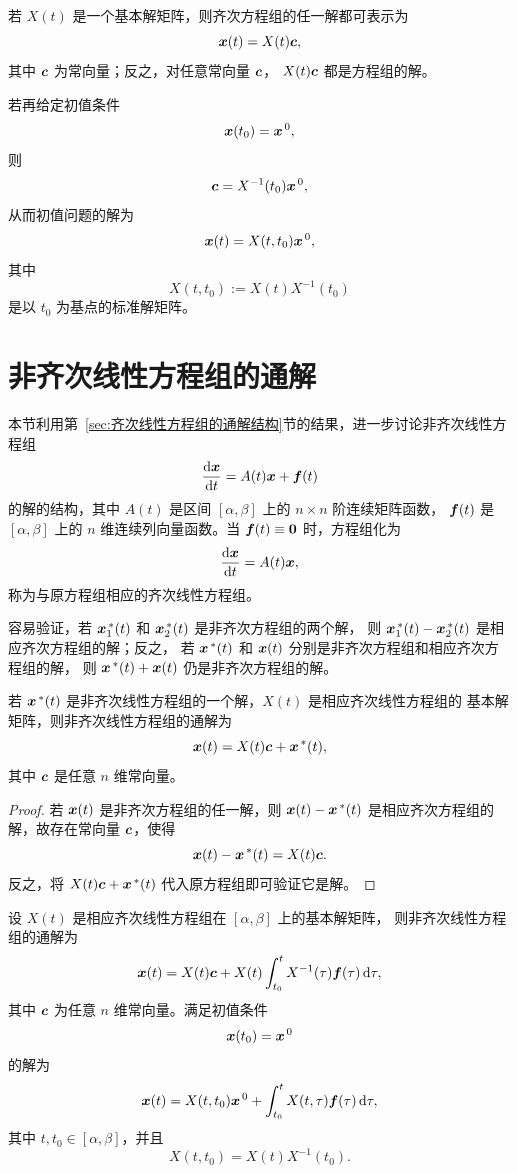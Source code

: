 若 $X(t)$ 是一个基本解矩阵，则齐次方程组的任一解都可表示为
\[
	\boldsymbol{x}(t)=X(t)\boldsymbol{c},
\]
其中 $\boldsymbol{c}$ 为常向量；反之，对任意常向量 $\boldsymbol{c}$，
$X(t)\boldsymbol{c}$ 都是方程组的解。

若再给定初值条件
\[
	\boldsymbol{x}(t_0)=\boldsymbol{x}^{\,0},
\]
则
\[
	\boldsymbol{c}=X^{-1}(t_0)\boldsymbol{x}^{\,0},
\]
从而初值问题的解为
\[
	\boldsymbol{x}(t)=X(t,t_0)\boldsymbol{x}^{\,0},
\]
其中
\[
	X(t,t_0):=X(t)X^{-1}(t_0)
\]
是以 $t_0$ 为基点的标准解矩阵。

\section{非齐次线性方程组的通解}\label{sec:非齐次线性方程组的通解}

本节利用第~\ref{sec:齐次线性方程组的通解结构}节的结果，进一步讨论非齐次线性方程组
\[
	\dfrac{\mathrm{d}\boldsymbol{x}}{\mathrm{d} t}=A(t)\boldsymbol{x}+\boldsymbol{f}(t)
\]
的解的结构，其中 $A(t)$ 是区间 $[\alpha,\beta]$ 上的 $n\times n$ 阶连续矩阵函数，
$\boldsymbol{f}(t)$ 是 $[\alpha,\beta]$ 上的 $n$ 维连续列向量函数。当
$\boldsymbol{f}(t)\equiv\boldsymbol{0}$ 时，方程组化为
\[
	\dfrac{\mathrm{d}\boldsymbol{x}}{\mathrm{d} t}=A(t)\boldsymbol{x},
\]
称为与原方程组相应的齐次线性方程组。

容易验证，若 $\boldsymbol{x}_1^{\,*}(t)$ 和 $\boldsymbol{x}_2^{\,*}(t)$ 是非齐次方程组的两个解，
则 $\boldsymbol{x}_1^{\,*}(t)-\boldsymbol{x}_2^{\,*}(t)$ 是相应齐次方程组的解；反之，
若 $\boldsymbol{x}^{\,*}(t)$ 和 $\boldsymbol{x}(t)$ 分别是非齐次方程组和相应齐次方程组的解，
则 $\boldsymbol{x}^{\,*}(t)+\boldsymbol{x}(t)$ 仍是非齐次方程组的解。

\begin{theorem}\label{thm:非齐次线性方程组的通解结构}
	若 $\boldsymbol{x}^{\,*}(t)$ 是非齐次线性方程组的一个解，$X(t)$ 是相应齐次线性方程组的
	基本解矩阵，则非齐次线性方程组的通解为
	\[
		\boldsymbol{x}(t)=X(t)\boldsymbol{c}+\boldsymbol{x}^{\,*}(t),
	\]
	其中 $\boldsymbol{c}$ 是任意 $n$ 维常向量。
\end{theorem}

\begin{proof}
	若 $\boldsymbol{x}(t)$ 是非齐次方程组的任一解，则
	$\boldsymbol{x}(t)-\boldsymbol{x}^{\,*}(t)$ 是相应齐次方程组的解，故存在常向量
	$\boldsymbol{c}$，使得
	\[
		\boldsymbol{x}(t)-\boldsymbol{x}^{\,*}(t)=X(t)\boldsymbol{c}.
	\]
	反之，将 $X(t)\boldsymbol{c}+\boldsymbol{x}^{\,*}(t)$ 代入原方程组即可验证它是解。
\end{proof}

\begin{theorem}\label{thm:常数变易公式}
	设 $X(t)$ 是相应齐次线性方程组在 $[\alpha,\beta]$ 上的基本解矩阵，
	则非齐次线性方程组的通解为
	\[
		\boldsymbol{x}(t)
		=X(t)\boldsymbol{c}
		+X(t)\int_{t_0}^{t}X^{-1}(\tau)\boldsymbol{f}(\tau)\,\mathrm{d}\tau,
	\]
	其中 $\boldsymbol{c}$ 为任意 $n$ 维常向量。满足初值条件
	\[
		\boldsymbol{x}(t_0)=\boldsymbol{x}^{\,0}
	\]
	的解为
	\[
		\boldsymbol{x}(t)
		=X(t,t_0)\boldsymbol{x}^{\,0}
		+\int_{t_0}^{t}X(t,\tau)\boldsymbol{f}(\tau)\,\mathrm{d}\tau,
	\]
	其中 $t,t_0\in[\alpha,\beta]$，并且
	\[
		X(t,t_0)=X(t)X^{-1}(t_0).
	\]
\end{theorem}

